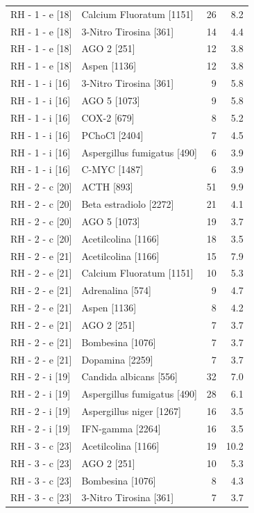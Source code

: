 \documentclass[a4paper,11pt]{article}
\begin{document}
\begin{footnotesize}
\begin{longtable}{p{3.5cm}p{7.5cm}rr}
RH - 1 - e [18] & Calcium Fluoratum [1151] & 26 & 8.2 \\
RH - 1 - e [18] & 3-Nitro Tirosina [361] & 14 & 4.4 \\
RH - 1 - e [18] & AGO 2 [251] & 12 & 3.8 \\
RH - 1 - e [18] & Aspen [1136] & 12 & 3.8 \\
RH - 1 - i [16] & 3-Nitro Tirosina [361] & 9 & 5.8 \\
RH - 1 - i [16] & AGO 5 [1073] & 9 & 5.8 \\
RH - 1 - i [16] & COX-2 [679] & 8 & 5.2 \\
RH - 1 - i [16] & PChoCl [2404] & 7 & 4.5 \\
RH - 1 - i [16] & Aspergillus fumigatus [490] & 6 & 3.9 \\
RH - 1 - i [16] & C-MYC [1487] & 6 & 3.9 \\
RH - 2 - c [20] & ACTH [893] & 51 & 9.9 \\
RH - 2 - c [20] & Beta estradiolo [2272] & 21 & 4.1 \\
RH - 2 - c [20] & AGO 5 [1073] & 19 & 3.7 \\
RH - 2 - c [20] & Acetilcolina [1166] & 18 & 3.5 \\
RH - 2 - e [21] & Acetilcolina [1166] & 15 & 7.9 \\
RH - 2 - e [21] & Calcium Fluoratum [1151] & 10 & 5.3 \\
RH - 2 - e [21] & Adrenalina [574] & 9 & 4.7 \\
RH - 2 - e [21] & Aspen [1136] & 8 & 4.2 \\
RH - 2 - e [21] & AGO 2 [251] & 7 & 3.7 \\
RH - 2 - e [21] & Bombesina [1076] & 7 & 3.7 \\
RH - 2 - e [21] & Dopamina [2259] & 7 & 3.7 \\
RH - 2 - i [19] & Candida albicans [556] & 32 & 7.0 \\
RH - 2 - i [19] & Aspergillus fumigatus [490] & 28 & 6.1 \\
RH - 2 - i [19] & Aspergillus niger [1267] & 16 & 3.5 \\
RH - 2 - i [19] & IFN-gamma [2264] & 16 & 3.5 \\
RH - 3 - c [23] & Acetilcolina [1166] & 19 & 10.2 \\
RH - 3 - c [23] & AGO 2 [251] & 10 & 5.3 \\
RH - 3 - c [23] & Bombesina [1076] & 8 & 4.3 \\
RH - 3 - c [23] & 3-Nitro Tirosina [361] & 7 & 3.7 \\

\end{longtable}
\end{footnotesize}
\end{document}
